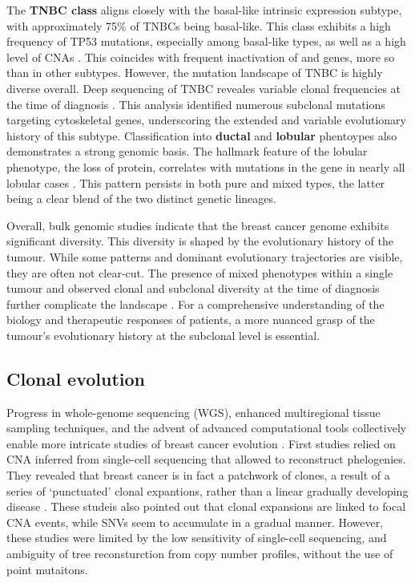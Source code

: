 The \textbf{\ac{TNBC} class} aligns closely with the basal-like intrinsic expression subtype, with approximately 75\% of \ac{TNBC}s being basal-like. This class exhibits a high frequency of TP53 mutations, especially among basal-like types, as well as a high level of \ac{CNA}s \parencite{Shah2012-xz, Cancer_Genome_Atlas_Network2012-gx}. This coincides with frequent inactivation of  and  genes, more so than in other subtypes. However, the mutation landscape of \ac{TNBC} is highly diverse overall. Deep sequencing of \ac{TNBC} reveales variable clonal frequencies at the time of diagnosis \parencite{Shah2012-xz}. This analysis identified numerous subclonal mutations targeting cytoskeletal genes, underscoring the extended and variable evolutionary history of this subtype.
Classification into \textbf{ductal} and \textbf{lobular} phentoypes also demonstrates a strong genomic basis. The hallmark feature of the lobular phenotype, the loss of  protein, correlates with mutations in the  gene in nearly all lobular cases \parencite{Ciriello2015-ey}. This pattern persists in both pure and mixed types, the latter being a clear blend of the two distinct genetic lineages.

Overall, bulk genomic studies indicate that the breast cancer genome exhibits significant diversity. This diversity is shaped by the evolutionary history of the tumour. While some patterns and dominant evolutionary trajectories are visible, they are often not clear-cut. The presence of mixed phenotypes within a single tumour and observed clonal and subclonal diversity at the time of diagnosis further complicate the landscape \parencite{Ciriello2015-ey,Pereira2016-ov,Shah2012-xz}. For a comprehensive understanding of the biology and therapeutic responses of patients, a more nuanced grasp of the tumour's evolutionary history at the subclonal level is essential.

\subsection{Clonal evolution}

Progress in whole-genome sequencing (WGS), enhanced multiregional tissue sampling techniques, and the advent of advanced computational tools collectively enable more intricate studies of breast cancer evolution . First studies relied on \ac{CNA} inferred from single-cell sequencing that allowed to reconstruct phelogenies. They revealed that breast cancer is in fact a patchwork of clones, a result of a series of `punctuated' clonal expantions, rather than a linear gradually developing disease \parencite{Navin2011-qq,Wang2014-bp,Gao2016-qv}. These studeis also pointed out that clonal expansions are linked to focal \ac{CNA} events, while \acp{SNV} seem to accumulate in a gradual manner. However, these studies were limited by the low sensitivity of single-cell sequencing, and ambiguity of tree reconsturction from copy number profiles, without the use of point mutaitons.

